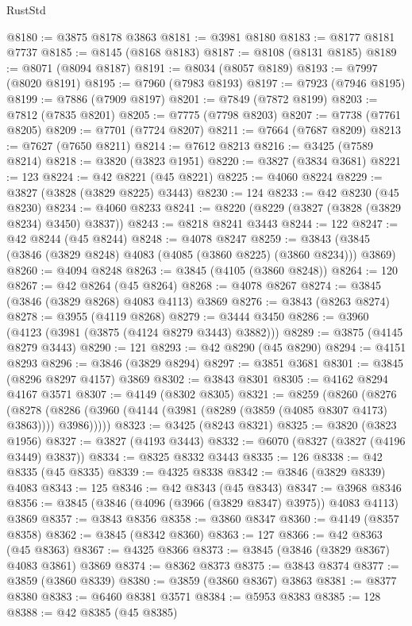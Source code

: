 \begin{lexlean}{RustStd}
\begin{coremodule}
@8180 := @3875 @8178 @3863
@8181 := @3981 @8180
@8183 := @8177 @8181 @7737
@8185 := @8145 (@8168 @8183)
@8187 := @8108 (@8131 @8185)
@8189 := @8071 (@8094 @8187)
@8191 := @8034 (@8057 @8189)
@8193 := @7997 (@8020 @8191)
@8195 := @7960 (@7983 @8193)
@8197 := @7923 (@7946 @8195)
@8199 := @7886 (@7909 @8197)
@8201 := @7849 (@7872 @8199)
@8203 := @7812 (@7835 @8201)
@8205 := @7775 (@7798 @8203)
@8207 := @7738 (@7761 @8205)
@8209 := @7701 (@7724 @8207)
@8211 := @7664 (@7687 @8209)
@8213 := @7627 (@7650 @8211)
@8214 := @7612 @8213
@8216 := @3425 (@7589 @8214)
@8218 := @3820 (@3823 @1951)
@8220 := @3827 (@3834 @3681)
@8221 := 123
@8224 := @42 @8221 (@45 @8221)
@8225 := @4060 @8224
@8229 := @3827 (@3828 (@3829 @8225) @3443)
@8230 := 124
@8233 := @42 @8230 (@45 @8230)
@8234 := @4060 @8233
@8241 := @8220 (@8229 (@3827 (@3828 (@3829 @8234) @3450) @3837))
@8243 := @8218 @8241 @3443
@8244 := 122
@8247 := @42 @8244 (@45 @8244)
@8248 := @4078 @8247
@8259 := @3843 (@3845 (@3846 (@3829 @8248) @4083 (@4085 (@3860 @8225) (@3860 @8234))) @3869)
@8260 := @4094 @8248
@8263 := @3845 (@4105 (@3860 @8248))
@8264 := 120
@8267 := @42 @8264 (@45 @8264)
@8268 := @4078 @8267
@8274 := @3845 (@3846 (@3829 @8268) @4083 @4113) @3869
@8276 := @3843 (@8263 @8274)
@8278 := @3955 (@4119 @8268)
@8279 := @3444 @3450
@8286 := @3960 (@4123 (@3981 (@3875 (@4124 @8279 @3443) @3882)))
@8289 := @3875 (@4145 @8279 @3443)
@8290 := 121
@8293 := @42 @8290 (@45 @8290)
@8294 := @4151 @8293
@8296 := @3846 (@3829 @8294)
@8297 := @3851 @3681
@8301 := @3845 (@8296 @8297 @4157) @3869
@8302 := @3843 @8301
@8305 := @4162 @8294 @4167 @3571
@8307 := @4149 (@8302 @8305)
@8321 := @8259
    (@8260
      (@8276
        (@8278 (@8286 (@3960 (@4144 (@3981 (@8289 (@3859 (@4085 @8307 @4173) @3863)))) @3986)))))
@8323 := @3425 (@8243 @8321)
@8325 := @3820 (@3823 @1956)
@8327 := @3827 (@4193 @3443)
@8332 := @6070 (@8327 (@3827 (@4196 @3449) @3837))
@8334 := @8325 @8332 @3443
@8335 := 126
@8338 := @42 @8335 (@45 @8335)
@8339 := @4325 @8338
@8342 := @3846 (@3829 @8339) @4083
@8343 := 125
@8346 := @42 @8343 (@45 @8343)
@8347 := @3968 @8346
@8356 := @3845 (@3846 (@4096 (@3966 (@3829 @8347) @3975)) @4083 @4113) @3869
@8357 := @3843 @8356
@8358 := @3860 @8347
@8360 := @4149 (@8357 @8358)
@8362 := @3845 (@8342 @8360)
@8363 := 127
@8366 := @42 @8363 (@45 @8363)
@8367 := @4325 @8366
@8373 := @3845 (@3846 (@3829 @8367) @4083 @3861) @3869
@8374 := @8362 @8373
@8375 := @3843 @8374
@8377 := @3859 (@3860 @8339)
@8380 := @3859 (@3860 @8367) @3863
@8381 := @8377 @8380
@8383 := @6460 @8381 @3571
@8384 := @5953 @8383
@8385 := 128
@8388 := @42 @8385 (@45 @8385)

\end{coremodule}
\end{lexlean}
